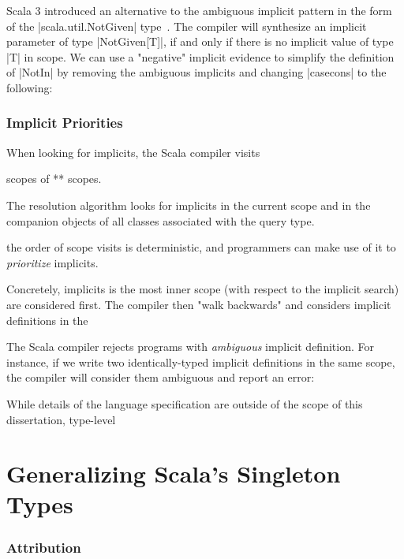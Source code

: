 \memImplicitContextMalloc

Scala 3 introduced an alternative to the ambiguous implicit pattern in the form of the |scala.util.NotGiven| type~\citep{dotty2014given}.
The compiler will synthesize an implicit parameter of type |NotGiven[T]|, if and only if there is no implicit value of type |T| in scope.
We can use a "negative" implicit evidence to simplify the definition of |NotIn| by removing the ambiguous implicits and changing |casecons| to the following:

\memImplicitNotGiven


\subsection{Implicit Priorities}

When looking for implicits, the Scala compiler visits

scopes of ** scopes.

The resolution algorithm looks for implicits in the current scope and in the companion objects of all classes associated with the query type.

the order of scope visits is deterministic, and programmers can make use of it to \emph{prioritize} implicits.

Concretely, implicits is the most inner scope (with respect to the implicit search) are considered first. The compiler then "walk backwards" and considers implicit definitions in the

The Scala compiler rejects programs with \emph{ambiguous} implicit definition.
For instance, if we write two identically-typed implicit definitions in the same scope, the compiler will consider them ambiguous and report an error:

While details of the language specification are outside of the scope of this dissertation, type-level \citep{odersky2006scala} \citep{odersky2009scala}

\removeAllWithPriority

\chapter{Generalizing Scala's Singleton Types}
\label{chap:generalizing-scala-s-singleton-types}
\subsection*{Attribution}
\citep{schmid2020coming}


